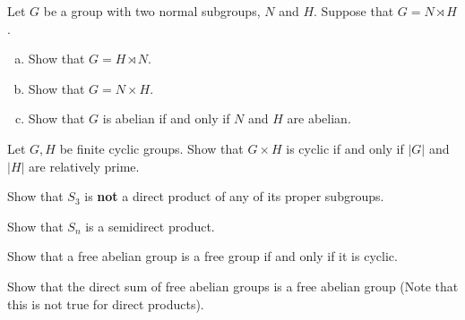 \documentclass{problemset}
\begin{document}
\begin{exercise} Let \(G\) be a group with two normal subgroups, \(N\) and \(H\).  Suppose that \(G = N \rtimes H\).
\begin{enumerate}[(a)]
\item Show that \(G = H \rtimes N\). 
\item Show that \(G = N \times H\).
\item Show that \(G\) is abelian if and only if \(N\) and \(H\) are abelian.
\end{enumerate}
\end{exercise}


\begin{exercise} Let \(G, H\) be finite cyclic groups.  Show that \(G \times H\) is cyclic if and only if \(|G|\) and \(|H|\) are relatively prime.
\end{exercise}


\begin{exercise} Show that \(S_3\) is \textbf{not} a direct product of any of its proper subgroups.
\end{exercise}


\begin{exercise} Show that \(S_n\) is a semidirect product.
\end{exercise}



\begin{exercise} Show that a free abelian group is a free group if and only if it is cyclic.
\end{exercise}



\begin{exercise} Show that the direct sum of free abelian groups is a free abelian group (Note that this is not true for direct products).
\end{exercise}



\end{document}
